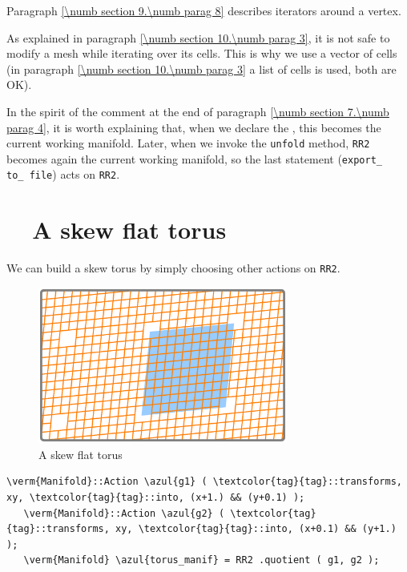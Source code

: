 Paragraph \ref{\numb section 9.\numb parag 8} describes iterators around a vertex.

As explained in paragraph \ref{\numb section 10.\numb parag 3}, it is not safe to
modify a mesh while iterating over its cells.
This is why we use a vector of cells (in paragraph \ref{\numb section 10.\numb parag 3}
a list of cells is used, both are OK).

In the spirit of the comment at the end of paragraph \ref{\numb section 7.\numb parag 4},
it is worth explaining that, when we declare the {\small\tt{}}
{\small\tt{}}, this becomes the current working manifold.
Later, when we invoke the {\small\tt unfold} method, {\small\tt RR2} becomes again the current
working manifold, so the last statement ({\small\tt export\_\,to\_\,file}) acts on {\small\tt RR2}.


\section{~~A skew flat torus}\label{\numb section 7.\numb parag 7}

We can build a skew torus by simply choosing other actions on {\small\tt RR2}.

\begin{figure}[ht] \centering
  \includegraphics[width=82mm]{flat-torus-3.eps}
  \caption{A skew flat torus}
  \label{\numb section 7.\numb fig 3}
\end{figure}

\begin{Verbatim}[commandchars=\\\{\},formatcom=\small\tt,frame=single,
   label=parag-\ref{\numb section 7.\numb parag 7}.cpp,rulecolor=\color{coment},
   baselinestretch=0.94,framesep=2mm                                            ]
   \verm{Manifold}::Action \azul{g1} ( \textcolor{tag}{tag}::transforms, xy, \textcolor{tag}{tag}::into, (x+1.) && (y+0.1) );
   \verm{Manifold}::Action \azul{g2} ( \textcolor{tag}{tag}::transforms, xy, \textcolor{tag}{tag}::into, (x+0.1) && (y+1.) );
   \verm{Manifold} \azul{torus_manif} = RR2 .quotient ( g1, g2 );
\end{Verbatim}

